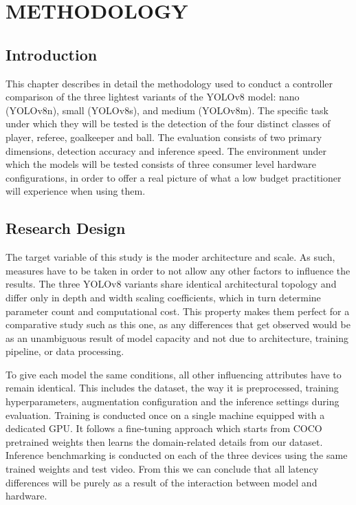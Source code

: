 \chapter{METHODOLOGY}
\label{ch:methodology}


\section{Introduction}

This chapter describes in detail the methodology used to conduct a controller comparison of the three lightest variants of the YOLOv8 model: nano (YOLOv8n), small (YOLOv8s), and medium (YOLOv8m). The specific task under which they will be tested is the detection of the four distinct classes of player, referee, goalkeeper and ball. The evaluation consists of two primary dimensions, detection accuracy and inference speed. The environment under which the models will be tested consists of three consumer level hardware configurations, in order to offer a real picture of what a low budget practitioner will experience when using them.

\section{Research Design}

The target variable of this study is the moder architecture and scale. As such, measures have to be taken in order to not allow any other factors to influence the results. The three YOLOv8 variants share identical architectural topology and differ only in depth and width scaling coefficients, which in turn determine parameter count and computational cost. This property makes them perfect for a comparative study such as this one, as any differences that get observed would be as an unambiguous result of model capacity and not due to architecture, training pipeline, or data processing.

To give each model the same conditions, all other influencing attributes have to remain identical. This includes the dataset, the way it is preprocessed, training hyperparameters, augmentation configuration and the inference settings during evaluation. Training is conducted once on a single machine equipped with a dedicated GPU. It follows a fine-tuning approach which starts from COCO pretrained weights then learns the domain-related details from our dataset. Inference benchmarking is conducted on each of the three devices using the same trained weights and test video. From this we can conclude that all latency differences will be purely as a result of the interaction between model and hardware.



